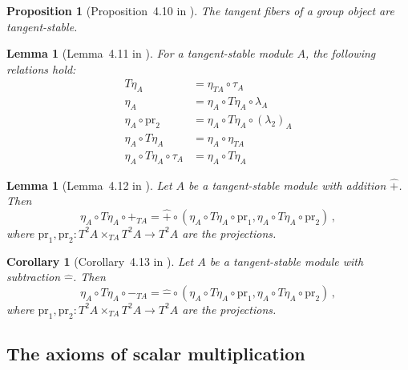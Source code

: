 \documentclass[12pt,reqno, a4paper]{amsart}
\numberwithin{equation}{section}
\theoremstyle{plain}
\newtheorem{Proposition}[Theorem]{Proposition}
\newtheorem{Lemma}[Theorem]{Lemma}
\newtheorem{Corollary}[Theorem]{Corollary}
\theoremstyle{definition}
\theoremstyle{remark}
\newcommand{\pr}{\mathrm{pr}}
\newcommand{\Val}{\eta}
\newcommand{\Aadd}{\hat{+}}
\newcommand{\Aminus}{\hat{-}}
\begin{document}
\begin{Proposition}[Proposition~4.10 in \cite{AintablianBlohmann:2026}]
\label{prop:frakgTanStable}
The tangent fibers of a group object are tangent-stable.
\end{Proposition}

\begin{Lemma}[Lemma~4.11 in \cite{AintablianBlohmann:2026}]
For a tangent-stable module $A$, the following relations hold:
\begin{align}
\label{eq:TEtaEtaTtau}
  T\Val_{A}
  &= \Val_{TA} \circ \tau_A
  \\
\label{eq:EtaTEtalambda}
  \Val_A
  &=
  \Val_A \circ T\Val_{A} \circ \lambda_{A}
  \\
\label{eq:EtaTEtalambda2}
  \Val_A \circ \pr_2
  &=
  \Val_A \circ T\Val_{A} \circ (\lambda_2)_A
  \\
\label{eq:EtaEtaT}
  \Val_A \circ T\Val_{A}
  &= \Val_A \circ \Val_{TA}
\\
\label{eq:EtaTEtaSymmetric01}
  \Val_A \circ T\Val_{A} \circ \tau_A
  &= \Val_A \circ T\Val_{A}
\end{align}
\end{Lemma}

\begin{Lemma}[Lemma~4.12 in \cite{AintablianBlohmann:2026}]
\label{lem:AaddTadd}
Let $A$ be a tangent-stable module with addition $\Aadd$. Then
\begin{equation*}
  \Val_A \circ T\Val_A \circ +_{T\!A}
  = \Aadd \circ
  ( \Val_A \circ T\Val_A \circ \pr_1,
    \Val_A \circ T\Val_A \circ \pr_2 )
  \,,
\end{equation*}
where $\pr_1, \pr_2: T^2\! A \times_{TA} T^2\! A \to T^2\!A$ are the projections.
\end{Lemma}
\begin{Corollary}[Corollary~4.13 in \cite{AintablianBlohmann:2026}]
\label{cor:AaddTminus}
Let $A$ be a tangent-stable module with subtraction $\Aminus$. Then
\begin{equation}
\label{eq:AminusTminus}
  \Val_A \circ T\Val_A \circ -_{T\!A}
  = \Aminus \circ
  ( \Val_A \circ T\Val_A \circ \pr_1,
    \Val_A \circ T\Val_A \circ \pr_2 )
  \,,
\end{equation}
where $\pr_1, \pr_2: T^2\! A \times_{TA} T^2\! A \to T^2\!A$ are the projections.
\end{Corollary}


\subsection{The axioms of scalar multiplication}
\label{sec:ScMult}
\end{document}
